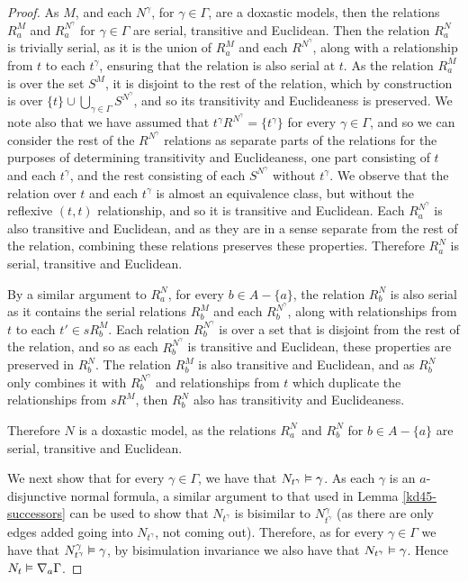 \begin{proof}
As $M$, and each $N^\gamma$, for $\gamma \in \Gamma$, are a doxastic models,
then the relations $R^M_a$ and $R^{N^\gamma}_a$ for $\gamma \in \Gamma$ are
serial, transitive and Euclidean. Then the relation $R^N_a$ is trivially serial,
as it is the union of $R^M_a$ and each $R^{N^\gamma}$, along with a relationship
from $t$ to each $t^\gamma$, ensuring that the relation is also serial at $t$.
As the relation $R^M_a$ is over the set $S^M$, it is disjoint to the rest of the
relation, which by construction is over $\{t\} \cup \bigcup_{\gamma \in
\Gamma} S^{N^\gamma}$, and so its transitivity and Euclideaness is preserved. We
note also that we have assumed that $t^\gamma R^{N^\gamma} = \{t^\gamma\}$ for
every $\gamma \in \Gamma$, and so we can consider the rest of the $R^{N^\gamma}$
relations as separate parts of the relations for the purposes of determining
transitivity and Euclideaness, one part consisting of $t$ and each $t^\gamma$,
and the rest consisting of each $S^{N^\gamma}$ without $t^\gamma$. We observe
that the relation over $t$ and each $t^\gamma$ is almost an equivalence class,
but without the reflexive $(t,t)$ relationship, and so it is transitive and
Euclidean. Each $R^{N^\gamma}_a$ is also transitive and Euclidean, and as they
are in a sense separate from the rest of the relation, combining these relations
preserves these properties. Therefore $R^N_a$ is serial, transitive and
Euclidean. 

By a similar argument to $R^N_a$, for every $b \in A - \{a\}$, the relation
$R^N_b$ is also serial as it contains the serial relations $R^M_b$ and each
$R^{N^\gamma}_b$, along with relationships from $t$ to each $t' \in sR^M_b$.
Each relation $R^{N^\gamma}_b$ is over a set that is disjoint from the rest of
the relation, and so as each $R^{N^\gamma}_b$ is transitive and Euclidean, these
properties are preserved in $R^N_b$. The relation $R^M_b$ is also transitive and
Euclidean, and as $R^N_b$ only combines it with $R^{N^\gamma}_b$ and
relationships from $t$ which duplicate the relationships from $sR^M$, then
$R^N_b$ also has transitivity and Euclideaness.

Therefore $N$ is a doxastic model, as the relations $R^N_a$ and $R^N_b$ for
$b \in A - \{a\}$ are serial, transitive and Euclidean.

We next show that for every $\gamma \in \Gamma$, we have that $N_{t^\gamma}
\vDash \gamma$. As each $\gamma$ is an $a$-disjunctive normal formula, a
similar argument to that used in Lemma \ref{kd45-successors} can be used to show
that $N_{t^\gamma}$ is bisimilar to $N^\gamma_{t^\gamma}$ (as there are only
edges added going into $N_{t^\gamma}$, not coming out). Therefore, as for every
$\gamma \in \Gamma$ we have that $N^\gamma_{t^\gamma} \vDash \gamma$, by
bisimulation invariance we also have that $N_{t^\gamma} \vDash \gamma$. Hence
$N_t \vDash \nabla_a \Gamma$.


\end{proof}
